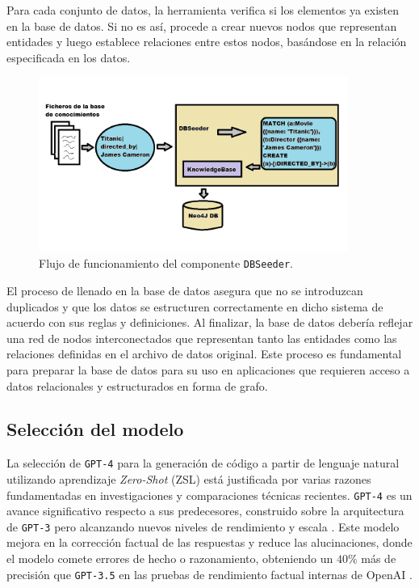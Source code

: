 Para cada conjunto de datos, la herramienta verifica si los elementos ya existen en la base de datos. Si no es así, procede a crear nuevos nodos que representan entidades y luego establece relaciones entre estos nodos, basándose en la relación especificada en los datos.

\begin{figure}[H]\label{dbseeder}
	\centering
	\includegraphics[width = 0.9\textwidth]{./Graphics/dbseeder}
	\caption{Flujo de funcionamiento del componente \texttt{DBSeeder}.}
\end{figure}

El proceso de llenado en la base de datos asegura que no se introduzcan duplicados y que los datos se estructuren correctamente en dicho sistema de acuerdo con sus reglas y definiciones. Al finalizar, la base de datos debería reflejar una red de nodos interconectados que representan tanto las entidades como las relaciones definidas en el archivo de datos original. Este proceso es fundamental para preparar la base de datos para su uso en aplicaciones que requieren acceso a datos relacionales y estructurados en forma de grafo.

\subsection{Selección del modelo} \label{model_selection}

La selección de \texttt{GPT-4} para la generación de código a partir de lenguaje natural utilizando aprendizaje \textit{Zero-Shot} (ZSL) está justificada por varias razones fundamentadas en investigaciones y comparaciones técnicas recientes.  \texttt{GPT-4} es un avance significativo respecto a sus predecesores, construido sobre la arquitectura de \texttt{GPT-3} pero alcanzando nuevos niveles de rendimiento y escala \cite{gpt4}. Este modelo mejora en la corrección factual de las respuestas y reduce las alucinaciones, donde el modelo comete errores de hecho o razonamiento, obteniendo un $40\%$ más de precisión que  \texttt{GPT-3.5} en las pruebas de rendimiento factual internas de OpenAI \cite{gpt4}.

